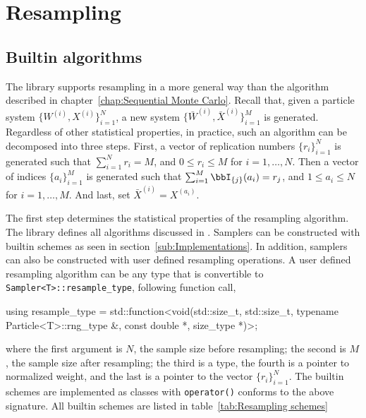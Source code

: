 \chapter{Resampling}
\label{chap:Resampling}

\section{Builtin algorithms}
\label{sec:Builtin algorithms}

The library supports resampling in a more general way than the algorithm
described in chapter~\ref{chap:Sequential Monte Carlo}. Recall that, given a
particle system $\{W^{(i)},X^{(i)}\}_{i=1}^N$, a new system $\{\bar{W}^{(i)},
\bar{X}^{(i)}\}_{i=1}^M$ is generated. Regardless of other statistical
properties, in practice, such an algorithm can be decomposed into three steps.
First, a vector of replication numbers $\{r_i\}_{i=1}^N$ is generated such that
$\sum_{i=1}^N r_i = M$, and $0 \le r_i \le M$ for $i=1,\dots,N$. Then a vector
of indices $\{a_i\}_{i=1}^M$ is generated such that $\sum_{i=1}^M
\bbI_{\{j\}}(a_i) = r_j$, and $1 \le a_i \le N$ for $i= 1,\dots,M$. And last,
set $\bar{X}^{(i)} = X^{(a_i)}$.

The first step determines the statistical properties of the resampling
algorithm. The library defines all algorithms discussed in
\textcite{Douc:2005wa}. Samplers can be constructed with builtin schemes as
seen in section~\ref{sub:Implementations}. In addition, samplers can also be
constructed with user defined resampling operations. A user defined resampling
algorithm can be any type that is convertible to
\verb|Sampler<T>::resample_type|,
following function call,
\begin{cppcode}
  using resample_type = std::function<void(std::size_t, std::size_t,
      typename Particle<T>::rng_type &, const double *, size_type *)>;
\end{cppcode}
where the first argument is $N$, the sample size before resampling; the second
is $M$, the sample size after resampling; the third is a \cppoo{} \rng type,
the fourth is a pointer to normalized weight, and the last is a pointer to the
vector $\{r_i\}_{i=1}^N$. The builtin schemes are implemented as classes with
\verb|operator()| conforms to the above signature. All builtin schemes are
listed in table~\ref{tab:Resampling schemes}

